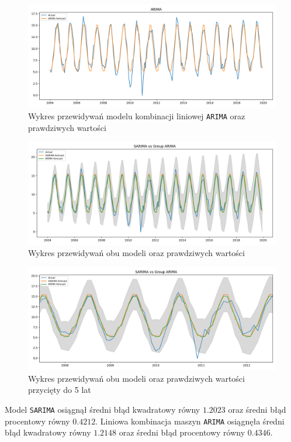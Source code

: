 \documentclass[12pt]{article}
\begin{document}
\begin{figure}[H]
    \includegraphics[width=\textwidth]{img/arima.png}
    \caption{Wykres przewidywań modelu kombinacji liniowej \texttt{ARIMA} oraz prawdziwych wartości}
\end{figure}

\begin{figure}[H]
    \includegraphics[width=\textwidth]{img/results.png}
    \caption{Wykres przewidywań obu modeli oraz prawdziwych wartości}
\end{figure}

\begin{figure}[H]
    \includegraphics[width=\textwidth]{img/results_5y.png}
    \caption{Wykres przewidywań obu modeli oraz prawdziwych wartości przycięty do 5 lat}
\end{figure}

Model \texttt{SARIMA} osiągnął średni błąd kwadratowy równy $\num{1.2023}$ oraz średni błąd procentowy równy $\num{0.4212}$. Liniowa kombinacja maszyn \texttt{ARIMA} osiągnęła średni błąd kwadratowy równy $\num{1.2148}$ oraz średni błąd procentowy równy $\num{0.4346}$.
\end{document}
